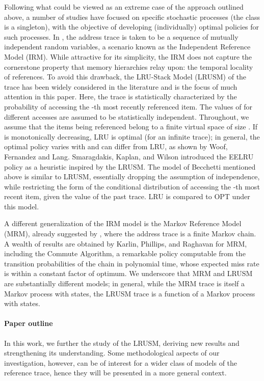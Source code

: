 \documentclass[11pt,a4paper]{article}
\theoremstyle{definition}
\theoremstyle{remark}
\begin{document}
Following what could be viewed as an extreme case of the approach
outlined above, a number of studies have focused on specific
stochastic processes (the class is a singleton), with the objective of
developing (individually) optimal policies for such processes.  In
\cite{FranaszekW74}, the address trace 
is taken to be a sequence of mutually independent random variables, a
scenario known as the Independent Reference Model (IRM).  While
attractive for its simplicity, the IRM does not capture the
cornerstone property that memory hierarchies relay upon: the temporal
locality of references.  To avoid this drawback, the LRU-Stack Model
(LRUSM) of the trace \cite{OdenS72,SpirnD72} has been widely
considered in the literature
\cite{TurnerS77,EffelsbergH84,KobayashiM89} and is the focus of much
attention in this paper.  Here, the trace is statistically
characterized by the probability  of accessing the -th most
recently referenced item.  The values of  for different accesses
are assumed to be statistically independent. Throughout, we assume
that the items being referenced belong to a finite virtual space of
size .  If  is monotonically decreasing, LRU is optimal
\cite{SpirnD72} (for an infinite trace); in general, the optimal
policy varies with  and can differ from LRU, as shown by Woof,
Fernandez and Lang\cite{WoodFL77,WoodFL83}. Smaragdakis, Kaplan, and
Wilson\cite{SmaragdakisKW99,SmaragdakisKW03} introduced the EELRU
policy as a heuristic inspired by the LRUSM. The model of Becchetti
\cite{Becchetti04} mentioned above is similar to LRUSM,  essentially
dropping the assumption of independence, while restricting the form of
the conditional distribution of accessing the -th most recent item,
given the value of the past trace. LRU is compared to OPT under this
model.

A different generalization of the IRM model is the Markov Reference
Model (MRM), already suggested by \cite{MattsonGST70}, where the
address trace is a finite Markov chain.  A wealth of results are
obtained by Karlin, Phillips, and Raghavan \cite{KarlinPR00} for MRM,
including the Commute Algorithm, a remarkable policy computable from
the transition probabilities of the chain in polynomial time, whose
expected miss rate is within a constant factor of optimum. We
underscore that MRM and LRUSM are substantially different models; in
general, while the MRM trace is itself a Markov process with 
states, the LRUSM trace is a function of a Markov process with 
states.

\paragraph{Paper outline} In this work, we further the study of the
LRUSM, deriving new results and strengthening its understanding. Some
methodological aspects of our investigation, however, can be of
interest for a wider class of models of the reference trace, hence
they will be presented in a more general context.
\end{document}
